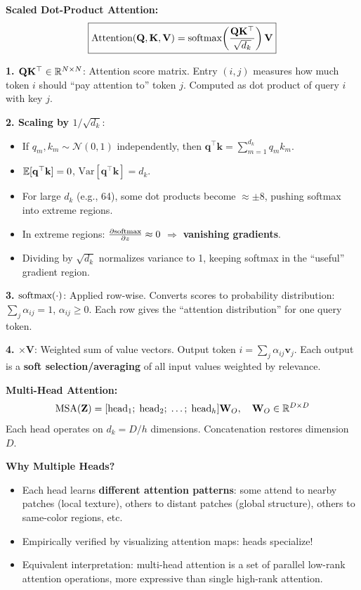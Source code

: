 \textbf{Scaled Dot-Product Attention:}
\begin{equation}\label{eq:attention}
\boxed{\text{Attention}(\mathbf{Q},\mathbf{K},\mathbf{V}) = \text{softmax}\!\left(\frac{\mathbf{Q}\mathbf{K}^\top}{\sqrt{d_k}}\right)\mathbf{V}}
\end{equation}

\begin{keybox}
\textbf{1. $\mathbf{Q}\mathbf{K}^\top \in \mathbb{R}^{N \times N}$}: Attention score matrix. Entry $(i,j)$ measures how much token $i$ should ``pay attention to'' token $j$. Computed as dot product of query $i$ with key $j$.

\textbf{2. Scaling by $1/\sqrt{d_k}$}: 
\begin{itemize}
\item If $q_m, k_m \sim \mathcal{N}(0,1)$ independently, then $\mathbf{q}^\top\mathbf{k} = \sum_{m=1}^{d_k} q_m k_m$.
\item $\mathbb{E}[\mathbf{q}^\top\mathbf{k}] = 0$, $\text{Var}[\mathbf{q}^\top\mathbf{k}] = d_k$.
\item For large $d_k$ (e.g., 64), some dot products become $\approx \pm 8$, pushing softmax into extreme regions.
\item In extreme regions: $\frac{\partial \text{softmax}}{\partial z} \approx 0$ $\Rightarrow$ \textbf{vanishing gradients}.
\item Dividing by $\sqrt{d_k}$ normalizes variance to 1, keeping softmax in the ``useful'' gradient region.
\end{itemize}

\textbf{3. $\text{softmax}(\cdot)$}: Applied row-wise. Converts scores to probability distribution: $\sum_j \alpha_{ij} = 1$, $\alpha_{ij} \geq 0$. Each row gives the ``attention distribution'' for one query token.

\textbf{4. $\times \mathbf{V}$}: Weighted sum of value vectors. Output token $i = \sum_j \alpha_{ij} \mathbf{v}_j$. Each output is a \textbf{soft selection/averaging} of all input values weighted by relevance.
\end{keybox}

\textbf{Multi-Head Attention:}
$$\text{MSA}(\mathbf{Z}) = [\text{head}_1;\;\text{head}_2;\;\ldots;\;\text{head}_h]\mathbf{W}_O, \quad \mathbf{W}_O \in \mathbb{R}^{D \times D}$$
Each head operates on $d_k{=}D/h$ dimensions. Concatenation restores dimension $D$.

\textbf{Why Multiple Heads?}
\begin{itemize}
\item Each head learns \textbf{different attention patterns}: some attend to nearby patches (local texture), others to distant patches (global structure), others to same-color regions, etc.
\item Empirically verified by visualizing attention maps: heads specialize!
\item Equivalent interpretation: multi-head attention is a set of parallel low-rank attention operations, more expressive than single high-rank attention.
\end{itemize}

